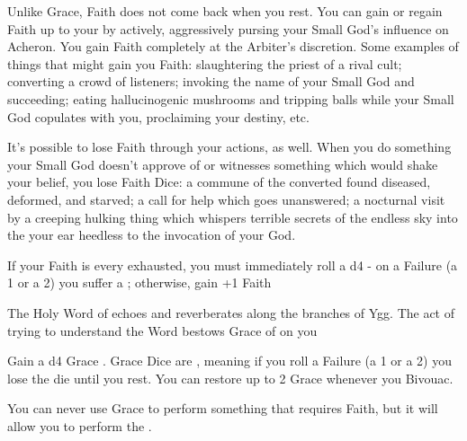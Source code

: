     Unlike Grace, Faith does not come back when you rest.  You can gain or regain Faith up to your \MAX by actively, aggressively pursing your Small God's influence on Acheron.  You gain Faith \UD completely at the Arbiter's discretion.  Some examples of things that might gain you Faith: slaughtering the priest of a rival cult; converting a crowd of listeners; invoking the name of your Small God and succeeding; eating hallucinogenic mushrooms and tripping balls while your Small God copulates with you, proclaiming your destiny, etc.

    It's possible to lose Faith through your actions, as well.  When you do something your Small God doesn't approve of or witnesses something which would shake your belief, you lose Faith Dice: a commune of the converted found diseased, deformed, and starved; a call for help which goes unanswered; a nocturnal visit by a creeping hulking thing which whispers terrible secrets of the endless sky into the your ear heedless to the invocation of your God.

    If your Faith \POOL is every exhausted, you must immediately roll a d4 - on a Failure (a 1 or a 2) you suffer a ; otherwise, gain +1 Faith \UD
  
   




    The Holy Word of \TheAuthority echoes and reverberates along the branches of Ygg.  The act of trying to understand the Word bestows Grace of \TheAuthority on you

    Gain a d4 Grace \UD.  Grace Dice are \POOL, meaning if you roll a Failure (a 1 or a 2) you lose the die until you rest.  You can restore up to 2 Grace \POOL whenever you Bivouac. 

    You can never use Grace to perform something that requires Faith, but it will allow you to perform the .
 
    \newpage


